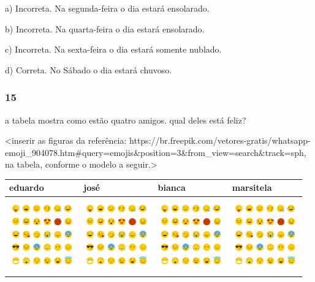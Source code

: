 a) Incorreta. Na segunda-feira o dia estará ensolarado.

b) Incorreta. Na quarta-feira o dia estará ensolarado.

c) Incorreta. Na sexta-feira o dia estará somente nublado.

d) Correta. No Sábado o dia estará chuvoso.

\subsubsection{15}\label{section-116}

a tabela mostra como estão quatro amigos. qual deles está feliz?

\textless{}inserir as figuras da referência:
https://br.freepik.com/vetores-gratis/whatsapp-emoji\_904078.htm\#query=emojis\&position=3\&from\_view=search\&track=sph,
na tabela, conforme o modelo a seguir.\textgreater{}

\begin{longtable}[]{@{}llll@{}}
\toprule
eduardo & josé & bianca & marsitela\tabularnewline
\midrule
\endhead
\includegraphics[width=1.11765in,height=1.26042in]{media/image139.jpg} &
\includegraphics[width=1.11765in,height=1.26042in]{media/image139.jpg} &
\includegraphics[width=1.11765in,height=1.12806in]{media/image139.jpg} &
\includegraphics[width=1.11765in,height=1.12806in]{media/image139.jpg}\tabularnewline
\bottomrule
\end{longtable}

